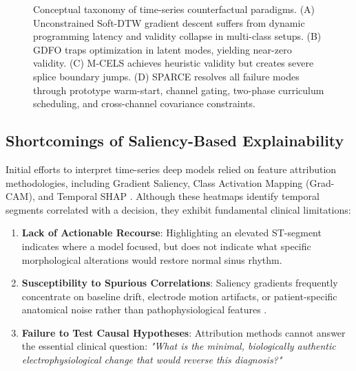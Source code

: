 \documentclass[conference]{IEEEtran}
\begin{document}
\begin{figure}[!t]
\caption{Conceptual taxonomy of time-series counterfactual paradigms. (A) Unconstrained Soft-DTW gradient descent suffers from dynamic programming latency and validity collapse in multi-class setups. (B) GDFO traps optimization in latent modes, yielding near-zero validity. (C) M-CELS achieves heuristic validity but creates severe splice boundary jumps. (D) SPARCE resolves all failure modes through prototype warm-start, channel gating, two-phase curriculum scheduling, and cross-channel covariance constraints.}
\label{fig:paradigm_comparison}
\end{figure}

\subsection{Shortcomings of Saliency-Based Explainability}
Initial efforts to interpret time-series deep models relied on feature attribution methodologies, including Gradient Saliency, Class Activation Mapping (Grad-CAM), and Temporal SHAP \cite{selvaraju2017grad, lundberg2017unified, assaf2019explainable}. Although these heatmaps identify temporal segments correlated with a decision, they exhibit fundamental clinical limitations:
\begin{enumerate}
    \item \textbf{Lack of Actionable Recourse}: Highlighting an elevated ST-segment indicates where a model focused, but does not indicate what specific morphological alterations would restore normal sinus rhythm.
    \item \textbf{Susceptibility to Spurious Correlations}: Saliency gradients frequently concentrate on baseline drift, electrode motion artifacts, or patient-specific anatomical noise rather than pathophysiological features \cite{adebayo2018sanity}.
    \item \textbf{Failure to Test Causal Hypotheses}: Attribution methods cannot answer the essential clinical question: \textit{"What is the minimal, biologically authentic electrophysiological change that would reverse this diagnosis?"}
\end{enumerate}
\end{document}
